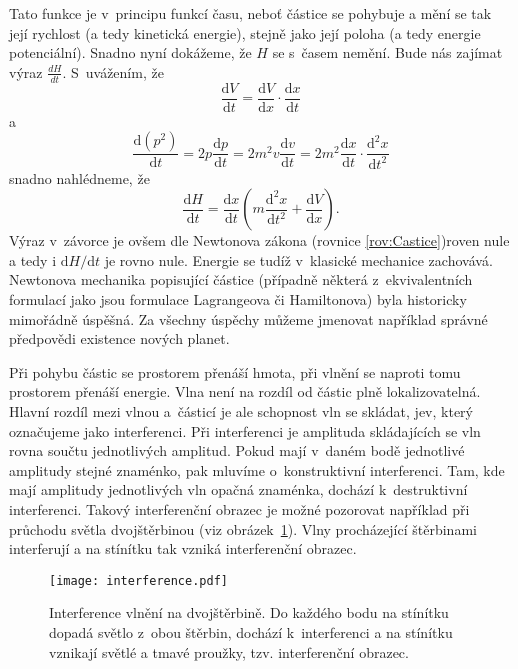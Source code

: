 Tato funkce je v~principu funkcí času, neboť částice se pohybuje a mění se tak její rychlost (a tedy kinetická energie), stejně jako její poloha (a tedy energie potenciální). Snadno nyní dokážeme, že $H$ se s~časem nemění. Bude nás zajímat výraz $\frac {dH}{dt}$. S~uvážením, že
\begin{equation}
\frac{\mathrm{d}V}{\mathrm{d}t} = \frac{\mathrm{d}V}{\mathrm{d}x}\cdot \frac{\mathrm{d}x}{\mathrm{d}t}\mbox{}
\label{rov:Castice2}
\end{equation}
a
\begin{equation}
\frac{\mathrm{d} (p^2)}{\mathrm{d}t}=2p\frac{\mathrm{d}p}{\mathrm{d}t}=2m^2v\frac{\mathrm{d}v}{\mathrm{d}t}=2m^2\frac{\mathrm{d}x}{\mathrm{d}t}\cdot\frac{\mathrm{d}^2x}{\mathrm{d}t^2}\mbox{}
\label{rov:Castice3}
\end{equation}
snadno nahlédneme, že
\begin{equation}
\frac{\mathrm{d}H}{\mathrm{d}t}=\frac{\mathrm{d}x}{\mathrm{d}t}\left ( m\frac{\mathrm{d}^2x}{\mathrm{d}t^2}+\frac{\mathrm{d}V}{\mathrm{d}x}\right )\mbox{.}
\label{rov:Castice4}
\end{equation}
Výraz v~závorce je ovšem dle Newtonova zákona (rovnice \ref{rov:Castice})roven nule a tedy i $\mathrm{d}H/\mathrm{d}t$ je rovno nule. Energie se tudíž v~klasické mechanice zachovává.
Newtonova mechanika popisující částice (případně některá z~ekvivalentních formulací jako jsou formulace Lagrangeova či Hamiltonova) byla historicky mimořádně úspěšná. Za všechny úspěchy můžeme jmenovat například správné předpovědi existence nových planet. 

Při pohybu částic se prostorem přenáší hmota, při vlnění se naproti tomu prostorem přenáší energie. Vlna není na rozdíl od částic plně lokalizovatelná. Hlavní rozdíl mezi vlnou a~částicí je ale schopnost vln se skládat, jev, který označujeme jako interferenci. Při interferenci je amplituda skládajících se vln rovna součtu jednotlivých amplitud. Pokud mají v~daném bodě jednotlivé amplitudy stejné znaménko, pak mluvíme o~konstruktivní interferenci. Tam, kde mají amplitudy jednotlivých vln opačná znaménka, dochází k~destruktivní interferenci. Takový interferenční obrazec je možné pozorovat například při průchodu světla  dvojštěrbinou (viz obrázek~\ref{obr:Interference}). Vlny procházející štěrbinami interferují a na stínítku tak vzniká interferenční obrazec. 

\begin{figure} [ht]
\centering
\texttt{[image: interference.pdf]}
\caption[Interference vlnění]{Interference vlnění na dvojštěrbině. Do každého bodu na stínítku dopadá světlo z~obou štěrbin, dochází k~interferenci a na stínítku vznikají světlé a tmavé proužky, tzv. interferenční obrazec.}
\label{obr:Interference}
\end{figure}


